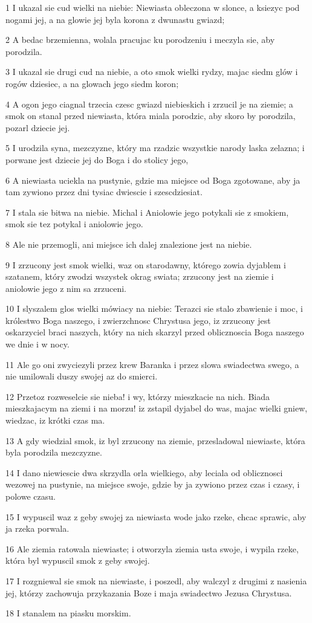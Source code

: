 \par 1 I ukazal sie cud wielki na niebie: Niewiasta obleczona w slonce, a ksiezyc pod nogami jej, a na glowie jej byla korona z dwunastu gwiazd;
\par 2 A bedac brzemienna, wolala pracujac ku porodzeniu i meczyla sie, aby porodzila.
\par 3 I ukazal sie drugi cud na niebie, a oto smok wielki rydzy, majac siedm glów i rogów dziesiec, a na glowach jego siedm koron;
\par 4 A ogon jego ciagnal trzecia czesc gwiazd niebieskich i zrzucil je na ziemie; a smok on stanal przed niewiasta, która miala porodzic, aby skoro by porodzila, pozarl dziecie jej.
\par 5 I urodzila syna, mezczyzne, który ma rzadzic wszystkie narody laska zelazna; i porwane jest dziecie jej do Boga i do stolicy jego,
\par 6 A niewiasta uciekla na pustynie, gdzie ma miejsce od Boga zgotowane, aby ja tam zywiono przez dni tysiac dwiescie i szescdziesiat.
\par 7 I stala sie bitwa na niebie. Michal i Aniolowie jego potykali sie z smokiem, smok sie tez potykal i aniolowie jego.
\par 8 Ale nie przemogli, ani miejsce ich dalej znalezione jest na niebie.
\par 9 I zrzucony jest smok wielki, waz on starodawny, którego zowia dyjablem i szatanem, który zwodzi wszystek okrag swiata; zrzucony jest na ziemie i aniolowie jego z nim sa zrzuceni.
\par 10 I slyszalem glos wielki mówiacy na niebie: Terazci sie stalo zbawienie i moc, i królestwo Boga naszego, i zwierzchnosc Chrystusa jego, iz zrzucony jest oskarzyciel braci naszych, który na nich skarzyl przed oblicznoscia Boga naszego we dnie i w nocy.
\par 11 Ale go oni zwyciezyli przez krew Baranka i przez slowa swiadectwa swego, a nie umilowali duszy swojej az do smierci.
\par 12 Przetoz rozweselcie sie nieba! i wy, którzy mieszkacie na nich. Biada mieszkajacym na ziemi i na morzu! iz zstapil dyjabel do was, majac wielki gniew, wiedzac, iz krótki czas ma.
\par 13 A gdy wiedzial smok, iz byl zrzucony na ziemie, przesladowal niewiaste, która byla porodzila mezczyzne.
\par 14 I dano niewiescie dwa skrzydla orla wielkiego, aby leciala od oblicznosci wezowej na pustynie, na miejsce swoje, gdzie by ja zywiono przez czas i czasy, i polowe czasu.
\par 15 I wypuscil waz z geby swojej za niewiasta wode jako rzeke, chcac sprawic, aby ja rzeka porwala.
\par 16 Ale ziemia ratowala niewiaste; i otworzyla ziemia usta swoje, i wypila rzeke, która byl wypuscil smok z geby swojej.
\par 17 I rozgniewal sie smok na niewiaste, i poszedl, aby walczyl z drugimi z nasienia jej, którzy zachowuja przykazania Boze i maja swiadectwo Jezusa Chrystusa.
\par 18 I stanalem na piasku morskim.

